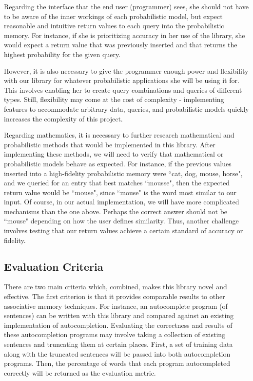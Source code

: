 \documentclass{sig-alternate}
\begin{document}
Regarding the interface that the end user (programmer) sees, she should not have to be aware of 
the inner workings of each probabilistic model, but expect reasonable and intuitive return values
to each query into the probabilistic memory. For instance, if she is prioritizing accuracy 
in her use of the library, she would expect a return value that was previously inserted and that 
returns the highest probability for the given query.

However, it is also necessary to give the programmer enough power and flexibility with our library for 
whatever probabilistic applications she will be using it for. This involves enabling 
her to create query combinations and queries of different types. Still, flexibility may 
come at the cost of complexity - implementing features to accommodate arbitrary data, queries,
and probabilistic models quickly increases the complexity of this project. 

Regarding mathematics, it is necessary to further research mathematical 
and probabilistic methods that would be implemented in this library. After implementing these methods,
we will need to verify that mathematical or probabilistic models behave as expected. 
For instance, if the previous values inserted into a high-fidelity probabilistic memory were ``cat, dog, mouse, horse", and we queried for an entry that best
matches ``mousse", 
then the expected return value would be ``mouse", since ``mouse" is the word most
similar to our input. 
Of course, in our actual implementation, we will have more complicated mechanisms than the one above. Perhaps the correct answer should not be ``mouse" depending
on how the user defines similarity. 
Thus, another challenge involves testing that our return values achieve a certain standard of accuracy or fidelity.

\subsection{Evaluation Criteria}
\label{subsec:eval_criteria}
There are two main criteria which, combined, makes this library novel and effective. 
The first criterion is that it provides comparable results to other associative memory techniques. 
For instance, an autocomplete program (of sentences) can be written with this library and compared against an existing implementation of autocompletion. 
Evaluating the correctness and results of these autocompletion programs may involve taking a collection of existing sentences and truncating them
at certain places. First, a set of training data along with the truncated sentences will be passed into both autocompletion programs. 
Then, the percentage of words that each program autocompleted correctly will be returned as the evaluation metric. 
\end{document}
